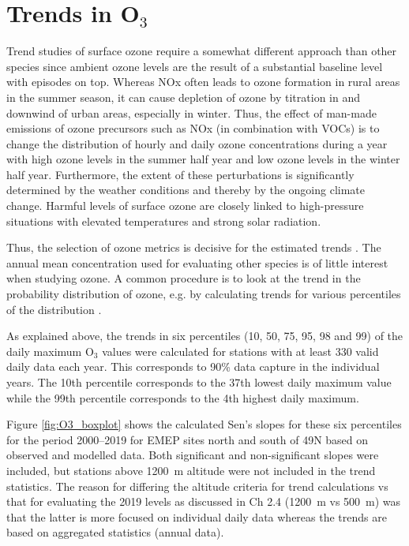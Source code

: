\section{\label{sec:Trends_O3}Trends in O$_3$ }

Trend studies of surface ozone require a somewhat different approach than other species since ambient ozone levels are the result of a substantial baseline level with episodes on top. 
 Whereas NOx often leads to ozone formation in rural areas in the summer season, it can cause depletion of ozone by titration in and downwind of urban areas, especially in winter.
Thus, the effect of man-made emissions of ozone precursors such as NOx (in combination with VOCs) is to change the distribution of hourly and daily ozone concentrations during a year with high ozone levels in the summer half year and low ozone levels in the winter half year. Furthermore, the extent of these perturbations is significantly determined by the weather conditions and thereby by the ongoing climate change. Harmful levels of surface ozone are closely linked to high-pressure situations with elevated temperatures and strong solar radiation.

Thus, the selection of ozone metrics is decisive for the estimated trends \citep[e.g.][]{LefohnTOAR2018}. The annual mean concentration used for evaluating other species is of little interest when studying ozone. A common procedure is to look at the trend in the probability distribution of ozone, e.g. by calculating trends for various percentiles of the distribution \citep[e.g.][]{SimpsonCOSUST2014}.  

As explained above, the trends in six percentiles (10, 50, 75, 95, 98 and 99) of the daily maximum O$_3$ values were calculated for stations with at least 330 valid daily data each year. This corresponds to 90\% data capture in the individual years. The 10th percentile corresponds to the 37th lowest daily maximum value while the 99th percentile corresponds to the 4th highest daily maximum. 

Figure \ref{fig:O3_boxplot} shows the calculated Sen's slopes for these six percentiles for the period 2000--2019 for EMEP sites north and south of 49\degrees N based on observed and modelled data. Both significant and non-significant slopes were included, but stations above 1200~m altitude were not included in the trend statistics. The reason for differing the altitude criteria for trend calculations vs that for evaluating the 2019 levels as discussed in Ch 2.4 (1200~m vs 500~m) was that the latter is more focused on individual daily data whereas the trends are based on aggregated statistics (annual data). 

